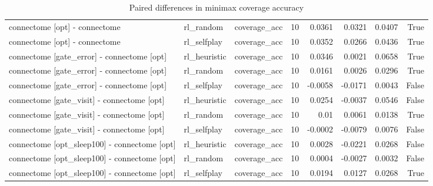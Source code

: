 \begin{table}[t]
\begin{tabular}{lllrrrrr}
connectome [opt] - connectome & rl\_random & coverage\_acc & 10 & 0.0361 & 0.0321 & 0.0407 & True \\
connectome [opt] - connectome & rl\_selfplay & coverage\_acc & 10 & 0.0352 & 0.0266 & 0.0436 & True \\
connectome [gate\_error] - connectome [opt] & rl\_heuristic & coverage\_acc & 10 & 0.0346 & 0.0021 & 0.0658 & True \\
connectome [gate\_error] - connectome [opt] & rl\_random & coverage\_acc & 10 & 0.0161 & 0.0026 & 0.0296 & True \\
connectome [gate\_error] - connectome [opt] & rl\_selfplay & coverage\_acc & 10 & -0.0058 & -0.0171 & 0.0043 & False \\
connectome [gate\_visit] - connectome [opt] & rl\_heuristic & coverage\_acc & 10 & 0.0254 & -0.0037 & 0.0546 & False \\
connectome [gate\_visit] - connectome [opt] & rl\_random & coverage\_acc & 10 & 0.01 & 0.0061 & 0.0138 & True \\
connectome [gate\_visit] - connectome [opt] & rl\_selfplay & coverage\_acc & 10 & -0.0002 & -0.0079 & 0.0076 & False \\
connectome [opt\_sleep100] - connectome [opt] & rl\_heuristic & coverage\_acc & 10 & 0.0028 & -0.0221 & 0.0268 & False \\
connectome [opt\_sleep100] - connectome [opt] & rl\_random & coverage\_acc & 10 & 0.0004 & -0.0027 & 0.0032 & False \\
connectome [opt\_sleep100] - connectome [opt] & rl\_selfplay & coverage\_acc & 10 & 0.0194 & 0.0127 & 0.0268 & True \\
\bottomrule
\end{tabular}
\caption{Paired differences in minimax coverage accuracy}
\label{tab:tictactoe_paired}
\end{table}